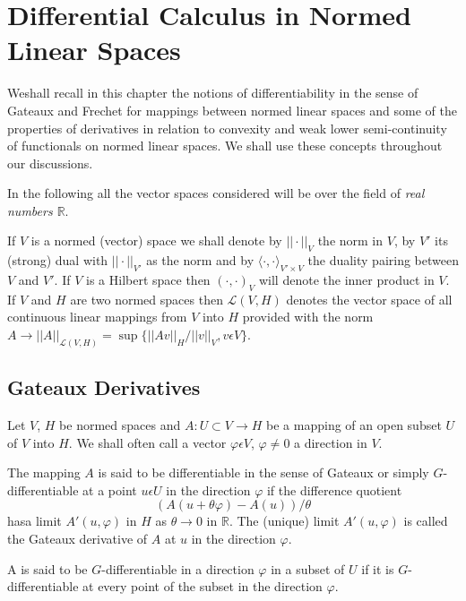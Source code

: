 
\chapter{Differential Calculus in Normed Linear Spaces}\label{chap1}

We\pageoriginale shall recall in this chapter the notions of differentiability in the sense of Gateaux and Frechet for mappings between normed linear spaces and some of the properties of derivatives in relation to convexity and weak lower semi-continuity of functionals on normed linear spaces. We shall use these concepts throughout our discussions.

In the following all the vector spaces considered will be over the field of {\em real numbers $\mathbb{R}$}.

If $V$ is a normed (vector) space we shall denote by $|| \cdot ||_{V}$ the norm in $V$, by $V'$ its (strong) dual with $|| \cdot ||_{V'}$ as the norm and by $\langle \cdot, \cdot \rangle_{V' \times V}$ the duality pairing between $V$ and $V'$. If $V$ is a Hilbert space then $(\cdot, \cdot)_{V}$ will denote the inner product in $V$. If $V$ and $H$ are two normed spaces then $\mathscr{L} (V, H)$ denotes the vector space of all continuous linear mappings from $V$ into $H$ provided with the norm $A \to ||A||_{\mathscr{L}(V, H)} = \sup \{ ||Av||_{H} / ||v||_{V}, v \epsilon V \}$. 

\section{Gateaux Derivatives}\label{chap1-sec1}
Let $V$, $H$ be normed spaces and $A: U \subset V \to H$ be a mapping of an open subset $U$ of $V$ into $H$. We shall often call a vector $\varphi \epsilon V$, $\varphi \neq 0$ a direction in $V$.

\begin{definition}\label{chap1-def1.1}
The mapping $A$ is said to be differentiable in the sense of Gateaux or simply $G$-differentiable at a point $u \epsilon U$ in the direction $\varphi$ if the difference quotient
$$
(A(u + \theta \varphi) - A(u))/\theta
$$
has\pageoriginale a limit $A'(u, \varphi)$ in $H$ as $\theta \to 0$ in $\mathbb{R}$. The (unique) limit $A'(u, \varphi)$ is called the Gateaux derivative of $A$ at $u$ in the direction $\varphi$.
\end{definition}

A is said to be $G$-differentiable in a direction $\varphi$ in a subset of $U$ if it is $G$-differentiable at every point of the subset in the direction $\varphi$.

